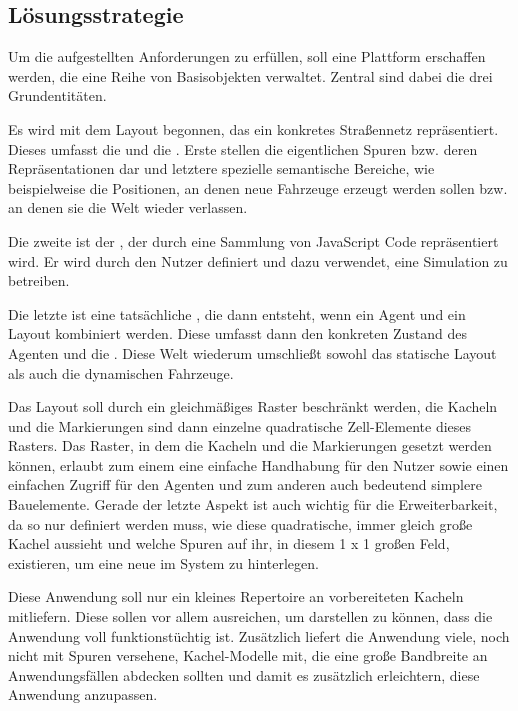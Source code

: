\subsection{Lösungsstrategie}


Um die aufgestellten Anforderungen zu erfüllen, soll eine Plattform erschaffen werden, die eine Reihe von Basisobjekten verwaltet.
Zentral sind dabei die drei Grundentitäten.

Es wird mit dem Layout  begonnen, das ein konkretes Straßennetz repräsentiert.
Dieses umfasst die  und die .
Erste stellen die eigentlichen Spuren bzw. deren Repräsentationen dar und letztere spezielle semantische Bereiche, wie beispielweise die Positionen, an denen neue Fahrzeuge erzeugt werden sollen bzw. an denen sie die Welt wieder verlassen.

Die zweite ist der , der durch eine Sammlung von JavaScript Code repräsentiert wird.
Er wird durch den Nutzer definiert und dazu verwendet, eine Simulation zu betreiben.

Die letzte ist eine tatsächliche , die dann entsteht, wenn ein Agent und ein Layout kombiniert werden.
Diese umfasst dann den konkreten Zustand des Agenten und die .
Diese Welt wiederum umschließt sowohl das statische Layout als auch die dynamischen Fahrzeuge.

Das Layout soll durch ein gleichmäßiges Raster beschränkt werden, die Kacheln und die Markierungen sind dann einzelne quadratische Zell-Elemente dieses Rasters.
Das Raster, in dem die Kacheln und die Markierungen gesetzt werden können, erlaubt zum einem eine einfache Handhabung für den Nutzer sowie einen einfachen Zugriff für den Agenten und zum anderen auch bedeutend simplere Bauelemente.
Gerade der letzte Aspekt ist auch wichtig für die Erweiterbarkeit, da so nur definiert werden muss, wie diese quadratische, immer gleich große Kachel aussieht und welche Spuren auf ihr, in diesem 1 x 1 großen Feld, existieren, um eine neue im System zu hinterlegen.

Diese Anwendung soll nur ein kleines Repertoire an vorbereiteten Kacheln mitliefern.
Diese sollen vor allem ausreichen, um darstellen zu können, dass die Anwendung voll funktionstüchtig ist.
Zusätzlich liefert die Anwendung viele, noch nicht mit Spuren versehene, Kachel-Modelle mit, die eine große Bandbreite an Anwendungsfällen abdecken sollten und damit es zusätzlich erleichtern, diese Anwendung anzupassen.

